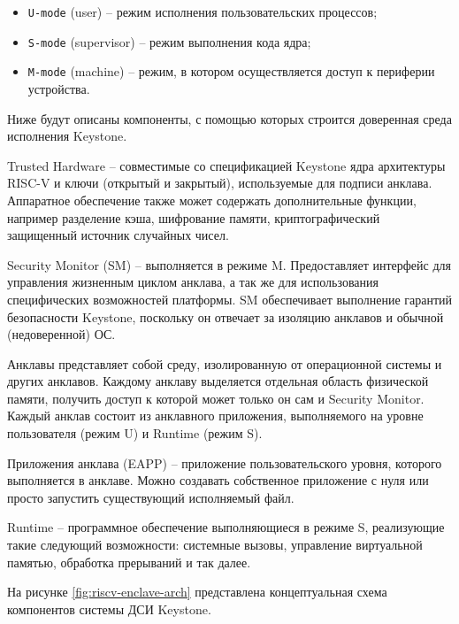 \begin{itemize}
	\item \texttt{U-mode} (user) -- режим исполнения пользовательских процессов;
	\item \texttt{S-mode} (supervisor) -- режим выполнения кода ядра;
	\item \texttt{M-mode} (machine) -- режим, в котором осуществляется доступ к периферии устройства.
\end{itemize}

Ниже будут описаны компоненты, с помощью которых строится доверенная среда исполнения Keystone.

Trusted Hardware -- совместимые со спецификацией Keystone ядра архитектуры RISC-V и ключи (открытый и закрытый), используемые для подписи анклава. Аппаратное обеспечение также может содержать дополнительные функции, например разделение кэша, шифрование памяти, криптографический защищенный источник случайных чисел.

Security Monitor (SM) -- выполняется в режиме M. Предоставляет интерфейс для управления жизненным циклом анклава, а так же для использования специфических возможностей платформы. SM обеспечивает выполнение гарантий безопасности Keystone, поскольку он отвечает за изоляцию анклавов и обычной (недоверенной) ОС. 

Анклавы представляет собой среду, изолированную от операционной системы и других анклавов. Каждому анклаву выделяется отдельная область физической памяти, получить доступ к которой может только он сам и Security Monitor. Каждый анклав состоит из анклавного приложения, выполняемого на уровне пользователя (режим  U) и Runtime (режим S).

Приложения анклава (EAPP) -- приложение пользовательского уровня, которого выполняется в анклаве. Можно создавать собственное приложение с нуля или просто запустить существующий исполняемый файл.

Runtime -- программное обеспечение выполняющиеся в режиме S, реализующие такие следующий возможности: системные вызовы, управление виртуальной памятью, обработка прерываний и так далее.

На рисунке \ref{fig:riscv-enclave-arch} представлена концептуальная схема компонентов системы ДСИ Keystone.

